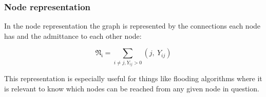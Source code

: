 \subsubsection{Node representation}

In the node representation the graph is represented by the connections
each node has and the admittance to each other node:

\begin{equation}
    \mathfrak{N_i} = \sum_{i \ne j, Y_{ij} > 0} (j, \ Y_{ij})
    \label{eq:graph_theory:node_form}
\end{equation}

This representation is especially useful for things like flooding algorithms where it is
relevant to know which nodes can be reached from any given node in question. 
